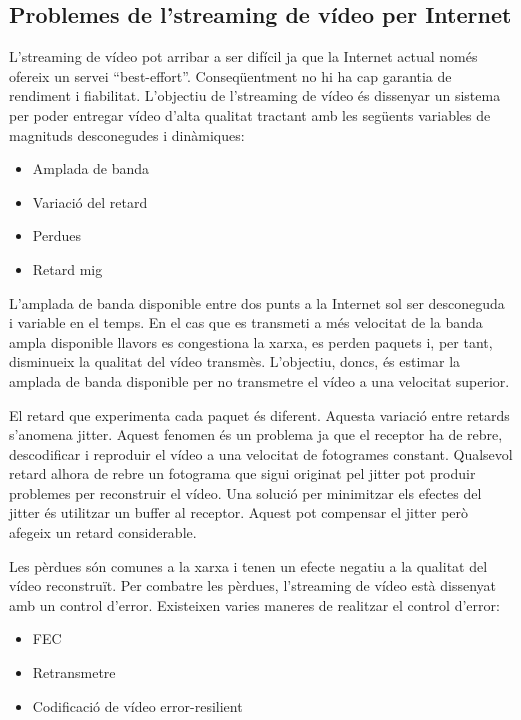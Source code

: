\documentclass[12pt, titlepage]{article}
\begin{document}
\subsection{Problemes de l’streaming de vídeo per Internet}
L’streaming de vídeo pot arribar a ser difícil ja que la Internet actual només ofereix
un servei “best-effort”. Conseqüentment no hi ha cap garantia de rendiment i
fiabilitat. L’objectiu de l’streaming de vídeo és dissenyar un sistema per poder
entregar vídeo d’alta qualitat tractant amb les següents variables de magnituds
desconegudes i dinàmiques:

\begin{itemize}
\item Amplada de banda
\item Variació del retard
\item Perdues
\item Retard mig
\end{itemize}

L'amplada de banda disponible entre dos punts a la Internet sol ser desconeguda i
variable en el temps. En el cas que es transmeti a més velocitat de la banda
ampla disponible llavors es congestiona la xarxa, es perden paquets i, per tant,
disminueix la qualitat del vídeo transmès. L’objectiu, doncs, és estimar la
amplada de banda disponible per no transmetre el vídeo a una velocitat superior.

El retard que experimenta cada paquet és diferent. Aquesta variació entre retards
s’anomena jitter. Aquest fenomen és un problema ja que el receptor ha de rebre,
descodificar i reproduir el vídeo a una velocitat de fotogrames constant.
Qualsevol retard alhora de rebre un fotograma que sigui originat pel jitter pot
produir problemes per reconstruir el vídeo. Una solució per minimitzar els
efectes del jitter és utilitzar un buffer al receptor. Aquest pot compensar el
jitter però afegeix un retard considerable.

Les pèrdues són comunes a la xarxa i tenen un efecte negatiu a la qualitat del
vídeo reconstruït. Per combatre les pèrdues, l’streaming de vídeo està dissenyat
amb un control d’error. Existeixen varies maneres de realitzar el control d’error:

\begin{itemize}
\item FEC
\item Retransmetre
\item Codificació de vídeo error-resilient
\end{itemize}
\end{document}
